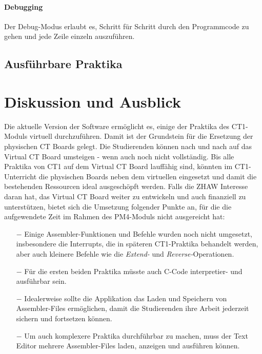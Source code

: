 \documentclass[10pt]{article}
\begin{document}
\paragraph{Debugging} Der Debug-Modus erlaubt es, Schritt für Schritt durch den Programmcode zu gehen und jede Zeile einzeln auszuführen.

\subsection{Ausführbare Praktika}


\section{Diskussion und Ausblick}

Die aktuelle Version der Software ermöglicht es, einige der Praktika des CT1-Moduls virtuell durchzuführen. Damit ist der Grundstein für die Ersetzung der physischen CT Boards gelegt. Die Studierenden können nach und nach auf das \glqq Virtual CT Board\grqq{} umsteigen - wenn auch noch nicht vollständig. Bis alle Praktika von CT1 auf dem \glqq Virtual CT Board\grqq{} lauffähig sind, könnten im CT1-Unterricht die physischen Boards neben dem virtuellen eingesetzt und damit die bestehenden Ressourcen ideal ausgeschöpft werden. Falls die ZHAW Interesse daran hat, das \glqq Virtual CT Board\grqq{} weiter zu entwickeln und auch finanziell zu unterstützen, bietet sich die Umsetzung folgender Punkte an, für die die aufgewendete Zeit im Rahmen des PM4-Moduls nicht ausgereicht hat:

\begin{itemize}
	\item[$-$] Einige Assembler-Funktionen und Befehle wurden noch nicht umgesetzt, insbesondere die Interrupts, die in späteren CT1-Praktika behandelt werden, aber auch kleinere Befehle wie die \emph{Extend-} und \emph{Reverse-}Operationen.
	\item[$-$] Für die ersten beiden Praktika müsste auch C-Code interpretier- und ausführbar sein.
	\item[$-$] Idealerweise sollte die Applikation das Laden und Speichern von Assembler-Files ermöglichen, damit die Studierenden ihre Arbeit jederzeit sichern und fortsetzen können.
	\item[$-$] Um auch komplexere Praktika durchführbar zu machen, muss der Text Editor mehrere Assembler-Files laden, anzeigen und ausführen können.


\end{itemize}
\end{document}
